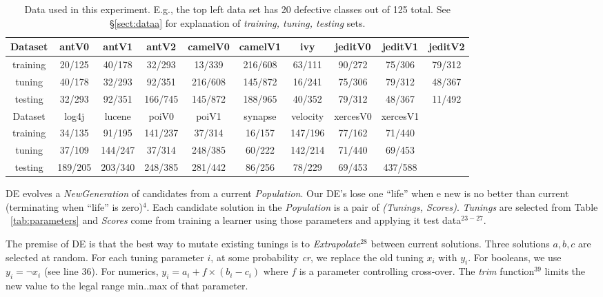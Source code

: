 \documentclass{sig-alternative}
\newcommand{\tion}[1]{\S\ref{sect:#1}}
\newcommand{\tab}[1]{Table ~\ref{tab:#1}}
\begin{document}
 \begin{table}[!t]

\renewcommand{\baselinestretch}{0.8}
\scriptsize
\centering
  \begin{tabular}{c c c c c c c c c c }\hline
  Dataset &antV0&antV1&antV2&camelV0&camelV1&ivy&jeditV0&jeditV1&jeditV2
\\\hline
  training &20/125 &40/178 &32/293 &13/339 &216/608 &63/111 &90/272 &75/306 &79/312
\\  tuning  &40/178 &32/293 &92/351 &216/608 &145/872 &16/241 &75/306 &79/312 &48/367
\\  testing &32/293 &92/351 &166/745 &145/872 &188/965 &40/352 &79/312 &48/367 &11/492
\\ \hline
  Dataset &log4j&lucene&poiV0&poiV1&synapse&velocity&xercesV0&xercesV1
\\\hline
  training &34/135 &91/195 &141/237 &37/314 &16/157 &147/196 &77/162 &71/440
\\  tuning  &37/109 &144/247 &37/314 &248/385 &60/222 &142/214 &71/440 &69/453
\\  testing &189/205 &203/340 &248/385 &281/442 &86/256 &78/229 &69/453 &437/588
\\  \end{tabular}

   \caption{Data used in this experiment. 
   E.g., the top left data set has 20 defective classes out of 125 total.
   See \tion{dataa} for explanation of {\em training, tuning, testing} sets.
   }\label{tab:data1}
\end{table} 

DE evolves a {\em NewGeneration} of candidates  from
a current {\em Population}.  Our DE's lose one ``life''
when e new is no better than  current (terminating when ``life'' is zero)$^{4}$.
Each candidate solution in the {\em Population}  
is a pair of {\em (Tunings, Scores)}.  {\em Tunings} are selected from
\tab{parameters} and {\em Scores} come from training a learner using those parameters
and applying it     test data$^{23-27}$.

The premise of DE  is that the best way to mutate existing tunings
is to {\em Extrapolate}$^{28}$
between current solutions.  Three solutions $a,b,c$ are selected at random.
For each tuning parameter $i$, at some probability {\em cr}, we replace
the old tuning $x_i$ with $y_i$. For booleans, we use $y_i= \neg x_i$ (see line 36). For numerics, $y_i = a_i+f \times (b_i - c_i)$   where $f$ is a parameter
controlling  cross-over.  The {\em trim} function$^{39}$ limits the new
value to the legal range min..max of that parameter.
 
\end{document}

